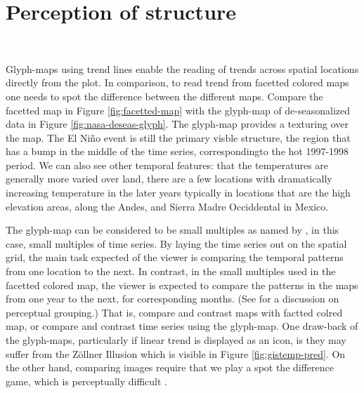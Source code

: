 \documentclass[oneside]{article}
\begin{document}




\section{Perception of structure}~\label{sec:scale}

Glyph-maps using trend lines enable the reading of trends across spatial locations directly from the plot. In comparison, to read trend from facetted colored maps one needs to spot the difference between the different maps.  Compare the facetted map in Figure \ref{fig:facetted-map} with the glyph-map of de-seasonalized data in Figure \ref{fig:nasa-deseas-glyph}. The glyph-map provides a texturing over the map. The El Ni\~no event is still the primary visble structure, the region that has a bump in the middle of the time series, correspondingto the hot 1997-1998 period. We can also see other temporal features: that the temperatures are generally more varied over land, there are a few locations with dramatically increasing temperature in the later years typically in locations that are the high elevation areas, along the Andes, and Sierra Madre Occiddental in Mexico.

The glyph-map can be considered to be small multiples as named by \citet{tufte:2001}, in this case, small multiples of time series. By laying the time series out on the spatial grid, the main task expected of the viewer is comparing the temporal patterns from one location to the next. In contrast, in the small multiples used in the facetted colored map, the viewer is expected to compare the patterns in the maps from one year to the next, for corresponding months. (See \citet{carr:1999} for a discussion on perceptual grouping.) That is, compare and contrast maps with factted colred map, or compare and contrast time series using the glyph-map. One draw-back of the glyph-maps, particularly if linear trend is displayed as an icon, is they may suffer from the Z\"ollner Illusion \citep{Zollner} which is visible in Figure \ref{fig:gistemp-pred}. On the other hand, comparing images require that we play a spot the difference game, which is perceptually difficult \citet{busey}.
\end{document}

